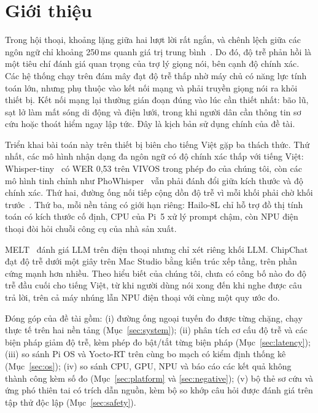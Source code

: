 \documentclass[a4paper,12pt,twocolumn]{article}
\begin{document}
\section{Giới thiệu}
Trong hội thoại, khoảng lặng giữa hai lượt lời rất ngắn, và chênh lệch giữa các ngôn ngữ chỉ khoảng 250\,ms quanh giá trị trung bình~\cite{stivers}. Do đó, độ trễ phản hồi là một tiêu chí đánh giá quan trọng của trợ lý giọng nói, bên cạnh độ chính xác. Các hệ thống chạy trên đám mây đạt độ trễ thấp nhờ máy chủ có năng lực tính toán lớn, nhưng phụ thuộc vào kết nối mạng và phải truyền giọng nói ra khỏi thiết bị. Kết nối mạng lại thường gián đoạn đúng vào lúc cần thiết nhất: bão lũ, sạt lở làm mất sóng di động và điện lưới, trong khi người dân cần thông tin sơ cứu hoặc thoát hiểm ngay lập tức. Đây là kịch bản sử dụng chính của đề tài.

Triển khai bài toán này trên thiết bị biên cho tiếng Việt gặp ba thách thức. Thứ nhất, các mô hình nhận dạng đa ngôn ngữ có độ chính xác thấp với tiếng Việt: Whisper-tiny~\cite{whisper} có WER 0,53 trên VIVOS trong phép đo của chúng tôi, còn các mô hình tinh chỉnh như PhoWhisper~\cite{phowhisper} vẫn phải đánh đổi giữa kích thước và độ chính xác. Thứ hai, đường ống nối tiếp cộng dồn độ trễ vì mỗi khối phải chờ khối trước~\cite{chipchat}. Thứ ba, mỗi nền tảng có giới hạn riêng: Hailo-8L chỉ hỗ trợ đồ thị tính toán có kích thước cố định, CPU của Pi~5 xử lý prompt chậm, còn NPU điện thoại đòi hỏi chuỗi công cụ của nhà sản xuất.

MELT~\cite{melt} đánh giá LLM trên điện thoại nhưng chỉ xét riêng khối LLM. ChipChat~\cite{chipchat} đạt độ trễ dưới một giây trên Mac Studio bằng kiến trúc xếp tầng, trên phần cứng mạnh hơn nhiều. Theo hiểu biết của chúng tôi, chưa có công bố nào đo độ trễ đầu cuối cho tiếng Việt, từ khi người dùng nói xong đến khi nghe được câu trả lời, trên cả máy nhúng lẫn NPU điện thoại với cùng một quy ước đo.

Đóng góp của đề tài gồm: (i) đường ống ngoại tuyến đo được từng chặng, chạy thực tế trên hai nền tảng (Mục~\ref{sec:system}); (ii) phân tích cơ cấu độ trễ và các biện pháp giảm độ trễ, kèm phép đo bật/tắt từng biện pháp (Mục~\ref{sec:latency}); (iii) so sánh Pi OS và Yocto-RT trên cùng bo mạch có kiểm định thống kê (Mục~\ref{sec:os}); (iv) so sánh CPU, GPU, NPU và báo cáo các kết quả không thành công kèm số đo (Mục~\ref{sec:platform} và \ref{sec:negative}); (v) bộ thẻ sơ cứu và ứng phó thiên tai có trích dẫn nguồn, kèm bộ so khớp câu hỏi được đánh giá trên tập thử độc lập (Mục~\ref{sec:safety}).
\end{document}
